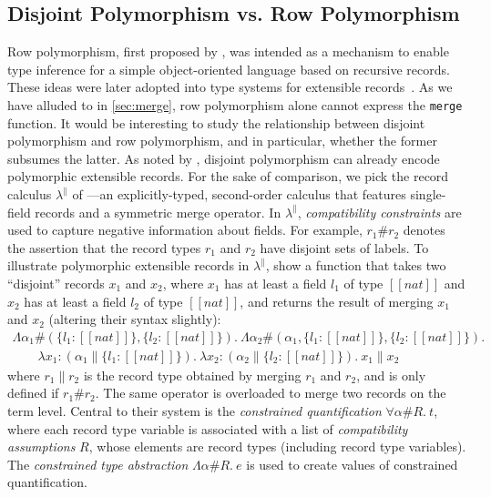\subsection{Disjoint Polymorphism vs. Row Polymorphism}

Row polymorphism, first proposed by \citet{wand1987complete}, was intended as a
mechanism to enable type inference for a simple object-oriented language based
on recursive records. These ideas were later adopted into type systems for
extensible records~\citep{Harper:1991:RCB:99583.99603, gaster1996polymorphic}.
As we have alluded to in \cref{sec:merge}, row polymorphism alone cannot express
the \lstinline{merge} function. It would be interesting to study the
relationship between disjoint polymorphism and row polymorphism, and in
particular, whether the former subsumes the latter. As noted by
\citet{alpuimdisjoint}, disjoint polymorphism can already encode polymorphic
extensible records. For the sake of comparison, we pick the record calculus
$\lambda^{\|}$ of \citet{Harper:1991:RCB:99583.99603}---an explicitly-typed,
second-order calculus that features single-field records and a symmetric merge
operator. In $\lambda^{\|}$, \textit{compatibility constraints} are used to
capture negative information about fields. For example, $r_1 \# r_2 $ denotes the
assertion that the record types $r_1$ and $r_2$ have disjoint sets of labels. To
illustrate polymorphic extensible records in $\lambda^{\|}$,
\citeauthor{Harper:1991:RCB:99583.99603} show a function that takes two
``disjoint'' records $x_1$ and $x_2$, where $x_1$ has at least a field $l_1$ of
type $[[nat]]$ and $x_2$ has at least a field $l_2$ of type $[[nat]]$, and
returns the result of merging $x_1$ and $x_2$ (altering their syntax slightly):
\begin{align*}
  \Lambda \alpha_1 \# (\{ l_1 : [[nat]] \}, \{ l_2 : [[nat]] \}) .\  \Lambda \alpha_2 \# (\alpha_1 , \{l_1 : [[nat]]\} , \{ l_2 : [[nat]]   \}) . \\
  \qquad \lambda x_1 : (\alpha_1 \| \{ l_1 : [[nat]] \}) .\  \lambda x_2 : (\alpha_2 \| \{ l_2 : [[nat]] \}) .\ x_1 \| x_2
\end{align*}
where $r_1 \| r_2$ is the record type obtained by merging $r_1$ and $r_2$, and
is only defined if $r_1 \# r_2$. The same operator is overloaded to merge two
records on the term level. Central to their system is the \textit{constrained
  quantification} $\forall \alpha \# R .\ t $, where each record type variable is
associated with a list of \textit{compatibility assumptions} $R$, whose elements
are record types (including record type variables). The \textit{constrained type abstraction} $\Lambda \alpha \# R.\ e$
is used to create values of constrained quantification.


